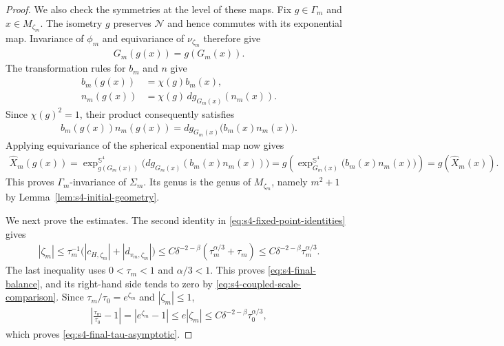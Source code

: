 \documentclass[a4paper,11pt,oneside,reqno]{amsart}
\numberwithin{equation}{section}
\theoremstyle{definition}
\begin{document}
\begin{proof}
    We also check the symmetries at the level of these maps.
    Fix $g\in\Gamma_m$ and $x\in M_{\zeta_m}$.
    The isometry $g$ preserves $\mathcal N$ and hence commutes
    with its exponential map. Invariance of $\phi_m$ and
    equivariance of $\nu_{\zeta_m}$ therefore give
    \begin{align*}
        G_m(g(x))=g(G_m(x)).
    \end{align*}
    The transformation rules for $b_m$ and $n$ give
    \begin{align*}
        b_m(g(x))&=\chi(g)b_m(x),\\
        n_m(g(x))&=\chi(g)\,d g_{G_m(x)}(n_m(x)).
    \end{align*}
    Since $\chi(g)^2=1$, their product consequently satisfies
    \begin{align*}
        b_m(g(x))n_m(g(x))
        =d g_{G_m(x)}\bigl(b_m(x)n_m(x)\bigr).
    \end{align*}
    Applying equivariance of the spherical exponential map now
    gives
    \begin{align*}
        \widehat X_m(g(x))=\exp_{g(G_m(x))}^{\mathbb S^4}
          \bigl(d g_{G_m(x)}(b_m(x)n_m(x))\bigr)=g\left(\exp_{G_m(x)}^{\mathbb S^4}
          \bigl(b_m(x)n_m(x)\bigr)\right)=g(\widehat X_m(x)).
    \end{align*}
    This proves $\Gamma_m$-invariance of $\Sigma_m$.
    Its genus is the genus of $M_{\zeta_m}$, namely $m^2+1$
    by Lemma~\ref{lem:s4-initial-geometry}.

    We next prove the estimates. The second identity in
    \eqref{eq:s4-fixed-point-identities} gives
    \begin{align*}
        |\zeta_m|
        \leq\tau_m^{-1}
        \bigl(|c_{H,\zeta_m}|+|d_{v_m,\zeta_m}|\bigr)\leq C\delta^{-2-\beta}
        (\tau_m^{\alpha/3}+\tau_m)
        \leq C\delta^{-2-\beta}\tau_m^{\alpha/3}.
    \end{align*}
    The last inequality uses $0<\tau_m<1$ and $\alpha/3<1$.
    This proves \eqref{eq:s4-final-balance}, and its right-hand
    side tends to zero by \eqref{eq:s4-coupled-scale-comparison}.
    Since $\tau_m/\tau_0=e^{\zeta_m}$ and $|\zeta_m|\leq1$,
    \begin{align*}
        \left|\frac{\tau_m}{\tau_0}-1\right|
        =|e^{\zeta_m}-1|
        \leq e|\zeta_m|
        \leq C\delta^{-2-\beta}\tau_0^{\alpha/3},
    \end{align*}
    which proves \eqref{eq:s4-final-tau-asymptotic}.


\end{proof}
\end{document}
